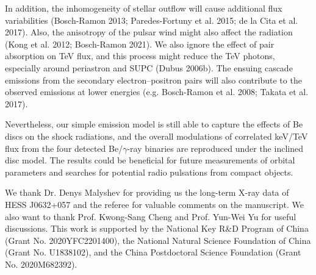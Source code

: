 \documentclass{aa}
\def\HESSJ0632{HESS J0632+057}
\begin{document}
In addition, the inhomogeneity of stellar outflow will cause additional flux variabilities (Bosch-Ramon 2013; Paredes-Fortuny et al. 2015; de la Cita et al. 2017). Also, the anisotropy of the pulsar wind might also affect the radiation (Kong et al. 2012; Bosch-Ramon 2021).
We also ignore the effect of pair absorption on TeV flux, and this process might reduce the TeV photons, especially around periastron and SUPC (Dubus 2006b). The ensuing cascade emissions from the secondary electron--positron pairs will also contribute to the observed emissions at lower energies (e.g. Bosch-Ramon et al. 2008; Takata et al. 2017).

Nevertheless, our simple emission model is still able to capture the effects of Be discs on the shock radiations, and the overall modulations of correlated keV/TeV flux from the four detected Be/$\gamma$-ray binaries are reproduced under the inclined disc model.
The results could be beneficial for future measurements of orbital parameters and searches for potential radio pulsations from compact objects.


\begin{acknowledgements}
We thank Dr. Denys Malyshev for providing us the long-term X-ray data of \HESSJ0632 and the referee for valuable comments on the manuscript. We also want to thank Prof. Kwong-Sang Cheng and Prof. Yun-Wei Yu for useful discussions. This work is supported by the National Key R\&D Program of China (Grant No. 2020YFC2201400), the National Natural Science Foundation of China (Grant No. U1838102), and the China Postdoctoral Science Foundation (Grant No. 2020M682392).
\end{acknowledgements}
\end{document}
